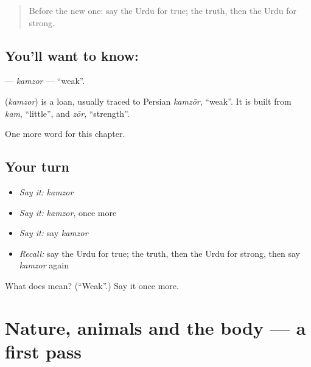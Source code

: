 \begin{quote}
Before the new one: say the Urdu for true; the truth, then the Urdu for strong.
\end{quote}

\subsection*{You'll want to know: }
\textbf{} — \emph{kamzor} — \textquotedblleft{}weak\textquotedblright{}.

\begin{cousinweb}
\textbf{} (\emph{kamzor}) is a loan, usually traced to Persian \emph{kamzōr}, \textquotedblleft{}weak\textquotedblright{}. It is built from \emph{kam}, \textquotedblleft{}little\textquotedblright{}, and \emph{zōr}, \textquotedblleft{}strength\textquotedblright{}.
\end{cousinweb}

\begin{grammarlens}[title={What you've built}]
One more word for this chapter.
\end{grammarlens}

\subsection*{Your turn}
\begin{itemize}
\raggedright
  \item \emph{Say it:} \emph{kamzor}
  \item \emph{Say it:} \emph{kamzor}, once more
  \item \emph{Say it:} say \emph{kamzor}
  \item \emph{Recall:} say the Urdu for true; the truth, then the Urdu for strong, then say \emph{kamzor} again
\end{itemize}

\begin{tcolorbox}[breakable,colback=teal!4,colframe=teal!35!black,title={Before you move on}]
What does  mean? (\textquotedblleft{}Weak\textquotedblright{}.) Say it once more.
\end{tcolorbox}
\section[(dialogue)]{Nature, animals and the body — a first pass}

\label{lesson:UR-R132-first-pass-nature-animals-and-the-body}



